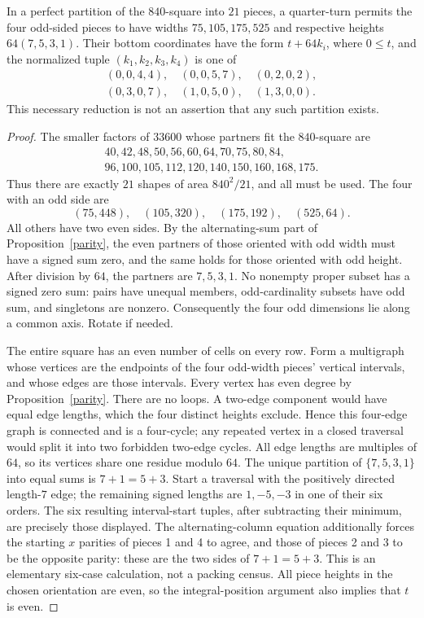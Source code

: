 \documentclass[11pt]{article}
\begin{document}
\begin{proposition}
In a perfect partition of the $840$-square into $21$ pieces, a quarter-turn
permits the four odd-sided pieces to have widths $75,105,175,525$ and respective
heights $64(7,5,3,1)$. Their bottom coordinates have the form $t+64k_i$, where
$0\le t$, and the normalized tuple $(k_1,k_2,k_3,k_4)$ is one of
\[
\begin{gathered}
 (0,0,4,4),\quad (0,0,5,7),\quad (0,2,0,2),\\
 (0,3,0,7),\quad (1,0,5,0),\quad (1,3,0,0).
\end{gathered}
\]
This necessary reduction is not an assertion that any such partition exists.
\end{proposition}
\begin{proof}
The smaller factors of $33600$ whose partners fit the $840$-square are
\[
\begin{gathered}
40,42,48,50,56,60,64,70,75,80,84,\\
96,100,105,112,120,140,150,160,168,175.
\end{gathered}
\]
Thus there are exactly $21$ shapes of area $840^2/21$, and all must be used.
The four with an odd side are
\[
 (75,448),\quad (105,320),\quad (175,192),\quad (525,64).
\]
All others have two even sides.
By the alternating-sum part of Proposition~\ref{parity}, the even partners of
those oriented with odd width must have a signed sum zero, and the same holds
for those oriented with odd height. After division by $64$, the partners are
$7,5,3,1$. No nonempty proper subset has a signed zero sum: pairs have unequal
members, odd-cardinality subsets have odd sum, and singletons are nonzero.
Consequently the four odd dimensions lie along a common axis. Rotate if needed.

The entire square has an even number of cells on every row. Form a multigraph
whose vertices are the endpoints of the four odd-width pieces' vertical
intervals, and whose edges are those intervals. Every vertex has even degree
by Proposition~\ref{parity}. There are no loops. A two-edge component would
have equal edge lengths, which the four distinct heights exclude. Hence this
four-edge graph is connected and is a four-cycle; any repeated vertex in a
closed traversal would split it into two forbidden two-edge cycles. All edge
lengths are multiples of $64$, so its vertices share one residue modulo $64$.
The unique partition of $\{7,5,3,1\}$ into equal sums is
$7+1=5+3$. Start a traversal with the positively directed length-$7$ edge;
the remaining signed lengths are $1,-5,-3$ in one of their six orders.
The six resulting interval-start tuples, after subtracting their minimum,
are precisely those displayed. The alternating-column equation additionally
forces the starting $x$ parities of pieces 1 and 4 to agree, and those of
pieces 2 and 3 to be the opposite parity: these are the two sides of
$7+1=5+3$. This is an elementary six-case calculation,
not a packing census. All piece heights in the chosen orientation are even,
so the integral-position argument also implies that $t$ is even.
\end{proof}
\end{document}
